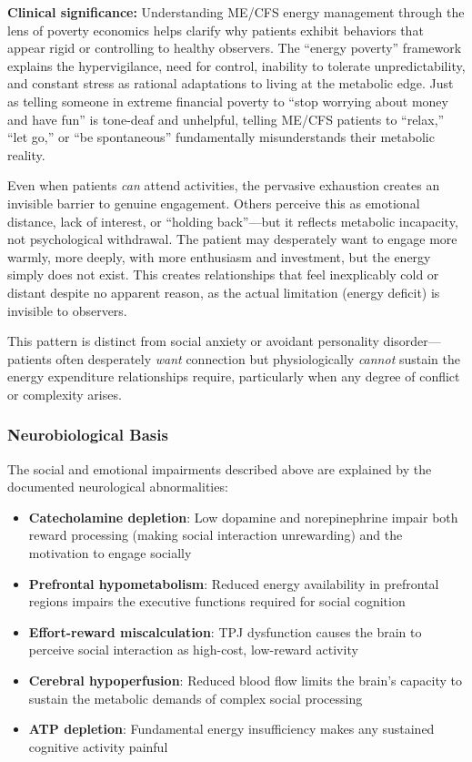 \textbf{Clinical significance:} Understanding ME/CFS energy management through the lens of poverty economics helps clarify why patients exhibit behaviors that appear rigid or controlling to healthy observers. The ``energy poverty'' framework explains the hypervigilance, need for control, inability to tolerate unpredictability, and constant stress as rational adaptations to living at the metabolic edge. Just as telling someone in extreme financial poverty to ``stop worrying about money and have fun'' is tone-deaf and unhelpful, telling ME/CFS patients to ``relax,'' ``let go,'' or ``be spontaneous'' fundamentally misunderstands their metabolic reality.

Even when patients \textit{can} attend activities, the pervasive exhaustion creates an invisible barrier to genuine engagement. Others perceive this as emotional distance, lack of interest, or ``holding back''---but it reflects metabolic incapacity, not psychological withdrawal. The patient may desperately want to engage more warmly, more deeply, with more enthusiasm and investment, but the energy simply does not exist. This creates relationships that feel inexplicably cold or distant despite no apparent reason, as the actual limitation (energy deficit) is invisible to observers.

This pattern is distinct from social anxiety or avoidant personality disorder---patients often desperately \textit{want} connection but physiologically \textit{cannot} sustain the energy expenditure relationships require, particularly when any degree of conflict or complexity arises.

\subsubsection{Neurobiological Basis}

The social and emotional impairments described above are explained by the documented neurological abnormalities:

\begin{itemize}
    \item \textbf{Catecholamine depletion}: Low dopamine and norepinephrine impair both reward processing (making social interaction unrewarding) and the motivation to engage socially
    \item \textbf{Prefrontal hypometabolism}: Reduced energy availability in prefrontal regions impairs the executive functions required for social cognition
    \item \textbf{Effort-reward miscalculation}: TPJ dysfunction causes the brain to perceive social interaction as high-cost, low-reward activity
    \item \textbf{Cerebral hypoperfusion}: Reduced blood flow limits the brain's capacity to sustain the metabolic demands of complex social processing
    \item \textbf{ATP depletion}: Fundamental energy insufficiency makes any sustained cognitive activity painful
\end{itemize}

